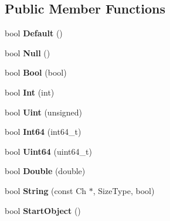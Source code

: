 \subsection*{Public Member Functions}
\begin{DoxyCompactItemize}
\item 
\mbox{\label{structBaseReaderHandler_a836437f6ccc37f08ff933f009b18a78c}} 
bool {\bfseries Default} ()
\item 
\mbox{\label{structBaseReaderHandler_ae2ebbde4628bf3659ddc5d18520935f5}} 
bool {\bfseries Null} ()
\item 
\mbox{\label{structBaseReaderHandler_aa1c3ce42dbb856b3349792dc9d963587}} 
bool {\bfseries Bool} (bool)
\item 
\mbox{\label{structBaseReaderHandler_a85e813aaf7189a2f87bd53953324fafc}} 
bool {\bfseries Int} (int)
\item 
\mbox{\label{structBaseReaderHandler_a0e683306cbb7b4e350a35c18c5246f2a}} 
bool {\bfseries Uint} (unsigned)
\item 
\mbox{\label{structBaseReaderHandler_a04011733ea584739c97ad5c6afa15a35}} 
bool {\bfseries Int64} (int64\+\_\+t)
\item 
\mbox{\label{structBaseReaderHandler_a351aa3cd81856a487c21022e9cc64d2b}} 
bool {\bfseries Uint64} (uint64\+\_\+t)
\item 
\mbox{\label{structBaseReaderHandler_a8156ea6ae5b8cd23a8b700e92a8af1eb}} 
bool {\bfseries Double} (double)
\item 
\mbox{\label{structBaseReaderHandler_a3ac69e6326d0aeef7b1f2619742bbe00}} 
bool {\bfseries String} (const Ch $\ast$, Size\+Type, bool)
\item 
\mbox{\label{structBaseReaderHandler_ab0a7d9bcececb8d6ed748656f67f4917}} 
bool {\bfseries Start\+Object} ()
\item 
\mbox{\label{structBaseReaderHandler_abc50b2e7e411b7b731715e05cd01e2eb}} 

\end{DoxyCompactItemize}
